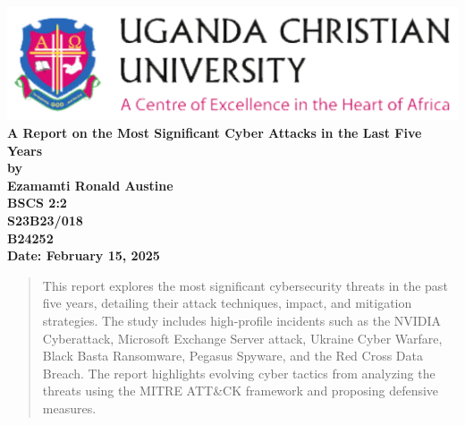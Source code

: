 \documentclass[a4paper,12pt]{article}
\begin{document}
\begin{titlepage}
    \begin{center}
    \vspace{2.5cm}  
        \includegraphics[width=17cm]{img/UCU.png} \\[1.5cm] %
        
        {\LARGE \textbf{A Report on the Most Significant Cyber Attacks in the Last Five Years}} \\[1cm]

        {  \Large \textbf{by}} \\[1cm]
        
        \Large \textbf{Ezamamti Ronald Austine}  \\[0.5cm]
        
        \textbf{BSCS 2:2} \\[0.5cm]
        
        \textbf{S23B23/018} \\[0.5cm]
        
        \textbf{B24252} \\[1cm]

        \textbf{Date: February 15, 2025}
    \end{center}
\end{titlepage}


\begin{center}
\vspace{2.5cm}
\begin{abstract}
\noindent This report explores the most significant cybersecurity threats in the past five years, detailing their attack techniques, impact, and mitigation strategies. The study includes high-profile incidents such as the NVIDIA Cyberattack, Microsoft Exchange Server attack, Ukraine Cyber Warfare, Black Basta Ransomware, Pegasus Spyware, and the Red Cross Data Breach. The report highlights evolving cyber tactics from analyzing the threats using the MITRE ATT\&CK framework and proposing defensive measures.
\end{abstract}
\end{center}
\end{document}
